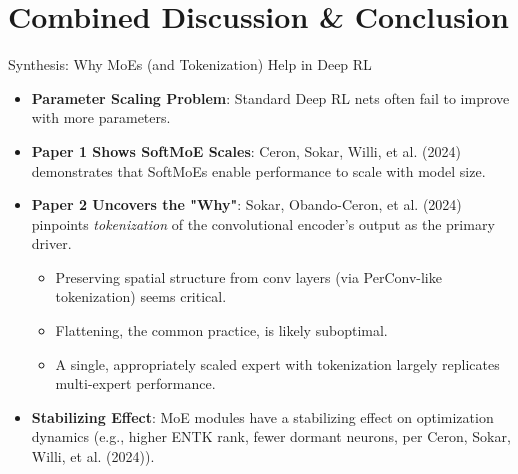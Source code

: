 \documentclass{beamer}
\newcommand{\ceronMoE}{Ceron, Sokar, Willi, et al. (2024)}
\newcommand{\sokarTokenize}{Sokar, Obando-Ceron, et al. (2024)}
\begin{document}
\section{Combined Discussion \& Conclusion}
\begin{frame}{Synthesis: Why MoEs (and Tokenization) Help in Deep RL}
  \begin{itemize}
    \item \textbf{Parameter Scaling Problem}: Standard Deep RL nets often fail to improve with more parameters.
    \item \textbf{Paper 1 Shows SoftMoE Scales}: \ceronMoE{} demonstrates that SoftMoEs enable performance to scale with model size.
    \item \textbf{Paper 2 Uncovers the "Why"}: \sokarTokenize{} pinpoints \textit{tokenization} of the convolutional encoder's output as the primary driver.
    \begin{itemize}
        \item Preserving spatial structure from conv layers (via PerConv-like tokenization) seems critical.
        \item Flattening, the common practice, is likely suboptimal.
        \item A single, appropriately scaled expert with tokenization largely replicates multi-expert performance.
    \end{itemize}
    \item \textbf{Stabilizing Effect}: MoE modules have a stabilizing effect on optimization dynamics (e.g., higher ENTK rank, fewer dormant neurons, per \ceronMoE{}).
  \end{itemize}
\end{frame}
\end{document}
